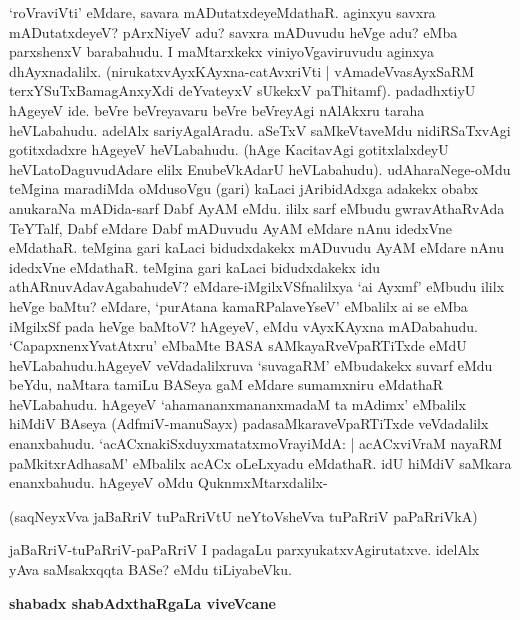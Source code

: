 \noindent
`roVraviVti' eMdare, savara mADutatxdeyeMdathaR. aginxyu savxra 
mADutatxdeyeV? pArxNiyeV adu? savxra mADuvudu heVge adu? eMba 
parxshenxV barabahudu. I maMtarxkekx viniyoVgaviru\-vudu aginxya 
dhAyxnadalilx. (nirukatxvAyxKAyxna-catAvxriVti | vAmadeVvasAyxSaRM\label{112} 
terxYSuTxBamagAnxyXdi deYvateyxV sUkekxV paThi\-tamf). padadhxtiyU hAgeyeV ide. beVre beVreyavaru beVre beVreyAgi nAlAkxru taraha heVLa\-bahudu. adelAlx sariyAgalAradu. aSeTxV saMkeVtaveMdu nidiRSaTxvAgi gotitxdadxre hAgeyeV heVLa\-bahudu. (hAge KacitavAgi gotitxlalxdeyU heVLatoDaguvudAdare elilx Enu\break beVkAdarU heVLa\-ba\-hudu). udA\-hara\-Nege-oMdu teMgina maradiMda oMdu\break soVgu (gari) kaLaci jAribidAdxga adakekx obabx\- anukaraNa mADida\--sarf Dabf AyAM eMdu. ililx sarf eMbudu gwravAthaRvAda TeYTalf, Dabf eMdare Dabf mADu\-vudu AyAM eMdare nAnu idedxVne eMdathaR. teMgina gari kaLaci bidudxdakekx mADuvudu AyAM eMdare\- nAnu idedxVne eMdathaR. teMgina gari kaLaci bidudxdakekx idu athARnuvAda\-vAgabahudeV? eMdare\--iMgilxVSfnalilxya `ai Ayxmf' \hbox{eMbudu} ililx heVge baMtu? eMdare, `purAtana kamaRPalaveYseV' eMbalilx\- ai se eMba iMgilxSf pada heVge baMtoV? hAgeyeV, eMdu vAyxKAyxna mADa\-bahudu. `Capapx\-nenxYva\-tAtxru' eMbaMte BASA sAMkayaRveVpaRTiTxde eMdU heVLabahudu.\break hAgeyeV veVdadalilxruva `suvagaRM'\- eMbudakekx suvarf eMdu beYdu, naMtara tamiLu BASeya gaM eMdare sumamxniru eMdathaR heVLa\-bahudu. hAgeyeV `aha\-mananxmananxmadaM ta mAdimx' eMbalilx hiMdiV BAseya (AdfmiV-manuSayx) pada\-saMkaraveVpaRTiTxde veVdadalilx enanxbahudu. `acACxnakiSxduyxmatatxmoVrayiMdA: | acACxviVraM nayaRM\- paMkitxrAdhasaM' eMbalilx acACx oLeLxyadu eMdathaR. idU hiMdiV saMkara enanxbahudu. hAgeyeV oMdu QuknmxMtarxdalilx-

(saqNeyxVva jaBaRriV tuPaRriVtU neYtoVsheVva tuPaRriV paPaRriVkA)\label{113}

jaBaRriV-tuPaRriV-paPaRriV I padagaLu parxyukatxvAgirutatxve. idelAlx yAva saMsakxqqta BASe? eMdu tiLiyabeVku.

{\bigskip
\noindent
{\large\bf shabadx shabAdxthaRgaLa viveVcane}}\label{page113}
\medskip

